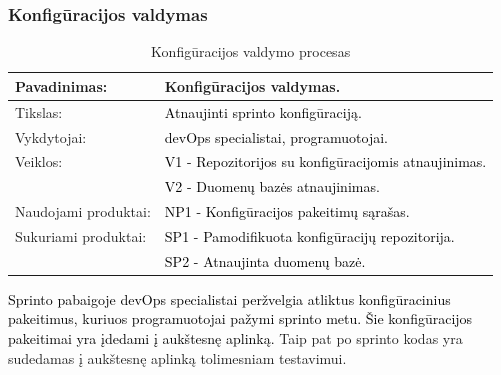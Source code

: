 \documentclass{VUMIFPSkursinis}
\begin{document}
	\subsubsection{Konfigūracijos valdymas}
	\begin{center}
		\begin{table}[ht]
			\caption{Konfigūracijos valdymo procesas}
			\begin{tabular}{ | l | l | }
				\hline
				Pavadinimas:         & Konfigūracijos valdymas.				\\ \hline
				Tikslas:             & \textcolor{black}{Atnaujinti sprinto konfigūraciją.}			\\ \hline
				Vykdytojai:          & \textcolor{black}{devOps specialistai, programuotojai.}			\\ \hline
				Veiklos:             & \textcolor{black}{V1 - Repozitorijos su konfigūracijomis atnaujinimas.}	\\
				                     & \textcolor{black}{V2 - Duomenų bazės atnaujinimas.	}		\\ \hline
				Naudojami produktai: & \textcolor{black}{NP1 - Konfigūracijos pakeitimų sąrašas.	}	\\ \hline
				Sukuriami produktai: & \textcolor{black}{SP1 - Pamodifikuota konfigūracijų repozitorija. }	\\
				                     & \textcolor{black}{SP2 - Atnaujinta duomenų bazė. }			\\ \hline
			\end{tabular}
		\end{table}
	\end{center}
		\textcolor{black}{Sprinto pabaigoje devOps specialistai peržvelgia atliktus konfigūracinius pakeitimus, kuriuos programuotojai pažymi sprinto metu.
		Šie konfigūracijos pakeitimai yra įdedami į aukštesnę aplinką.} Taip pat po sprinto kodas yra sudedamas į aukštesnę aplinką tolimesniam testavimui.
\end{document}
